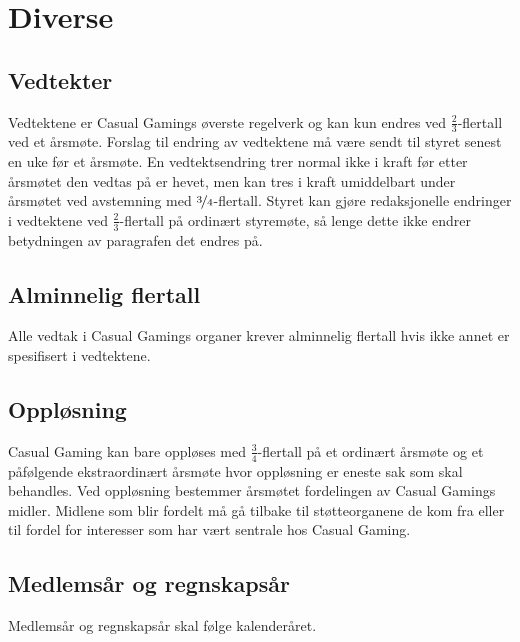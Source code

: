 \chapter{Diverse}

\section{Vedtekter}
Vedtektene er Casual Gamings øverste regelverk og kan kun endres ved $\frac{2}{3}$-flertall ved et årsmøte. Forslag til endring av vedtektene må være sendt til styret senest en uke før et årsmøte. En vedtektsendring trer normal ikke i kraft før etter årsmøtet den vedtas på er hevet, men kan tres i kraft umiddelbart under årsmøtet ved avstemning med $\nicefrac{3}{4}$-flertall. Styret kan gjøre redaksjonelle endringer i vedtektene ved $\frac{2}{3}$-flertall på ordinært styremøte, så lenge dette ikke endrer betydningen av paragrafen det endres på.

\section{Alminnelig flertall}
Alle vedtak i Casual Gamings organer krever alminnelig flertall hvis ikke annet er spesifisert i vedtektene.

\section{Oppløsning}
Casual Gaming kan bare oppløses med $\frac{3}{4}$-flertall på et ordinært årsmøte og et påfølgende ekstraordinært årsmøte hvor oppløsning er eneste sak som skal behandles. Ved oppløsning bestemmer årsmøtet fordelingen av Casual Gamings midler. Midlene som blir fordelt må gå tilbake til støtteorganene de kom fra eller til fordel for interesser som har vært sentrale hos Casual Gaming.

\section{Medlemsår og regnskapsår}
Medlemsår og regnskapsår skal følge kalenderåret.
